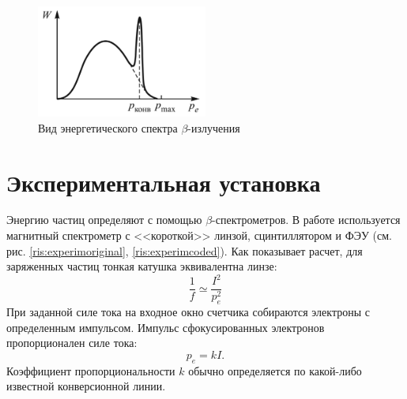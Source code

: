 \documentclass[a4paper,12pt]{article} %
\begin{document}
\begin{figure}[h]
    \centering
    \includegraphics[width=0.5\textwidth]{spectre.png}
    \caption{Вид энергетического спектра $\beta$-излучения}
    \label{fig:spectre}
\end{figure}

\section{Экспериментальная установка}
Энергию частиц определяют с помощью $\beta$-спектрометров. В работе используется магнитный спектрометр с <<короткой>> линзой, сцинтиллятором и ФЭУ (см. рис. \ref{ris:experimoriginal}, \ref{ris:experimcoded}). Как показывает расчет, для заряженных частиц тонкая катушка эквивалентна линзе:
\begin{equation}
    \frac{1}{f} \simeq \frac{I^2}{p_e^2}
\end{equation}
При заданной силе тока на входное окно счетчика собираются электроны с определенным импульсом. Импульс сфокусированных электронов пропорционален силе тока:
\begin{equation}\label{proportion}
    p_e = kI.
\end{equation}
Коэффициент пропорциональности $k$ обычно определяется по какой-либо известной конверсионной линии.
\end{document}
